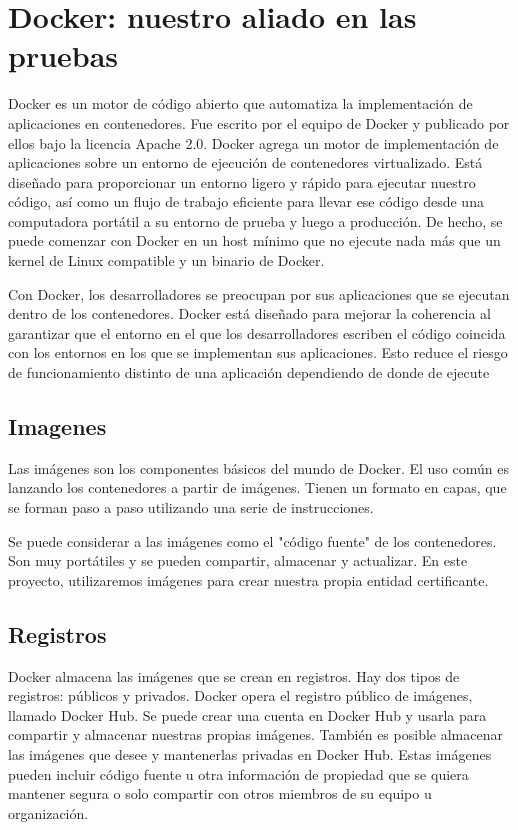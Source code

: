 \section{Docker: nuestro aliado en las pruebas}

Docker es un motor de código abierto que automatiza la implementación de aplicaciones 
en contenedores. Fue escrito por el equipo de Docker y publicado por ellos bajo la 
licencia Apache 2.0. Docker agrega un motor de implementación de aplicaciones sobre 
un entorno de ejecución de contenedores virtualizado. Está diseñado para proporcionar 
un entorno ligero y rápido para ejecutar nuestro código, así como un flujo de trabajo 
eficiente para llevar ese código desde una computadora portátil a su entorno de prueba 
y luego a producción. De hecho, se puede comenzar con Docker en un host mínimo que 
no ejecute nada más que un kernel de Linux compatible y un binario de Docker.

Con Docker, los desarrolladores se preocupan por sus aplicaciones que se ejecutan 
dentro de los contenedores. Docker está diseñado para mejorar la coherencia al 
garantizar que el entorno en el que los desarrolladores escriben el código coincida 
con los entornos en los que se implementan sus aplicaciones. Esto reduce el riesgo 
de funcionamiento distinto de una aplicación dependiendo de donde de ejecute


\subsection{Imagenes}
Las imágenes son los componentes básicos del mundo de Docker. El uso común es 
lanzando los contenedores a partir de imágenes. Tienen un formato en capas, que 
se forman paso a paso utilizando una serie de instrucciones.

Se puede considerar a las imágenes como el "código fuente" de los contenedores. 
Son muy portátiles y se pueden compartir, almacenar y actualizar. En este proyecto, 
utilizaremos imágenes para crear nuestra propia entidad certificante.

\subsection{Registros}
Docker almacena las imágenes que se crean en registros. Hay dos tipos de 
registros: públicos y privados. Docker opera el registro público de imágenes, 
llamado Docker Hub. Se puede crear una cuenta en Docker Hub y usarla para 
compartir y almacenar nuestras propias imágenes. También es posible almacenar 
las imágenes que desee y mantenerlas privadas en Docker Hub. Estas imágenes 
pueden incluir código fuente u otra información de propiedad que se quiera 
mantener segura o solo compartir con otros miembros de su equipo u organización.

